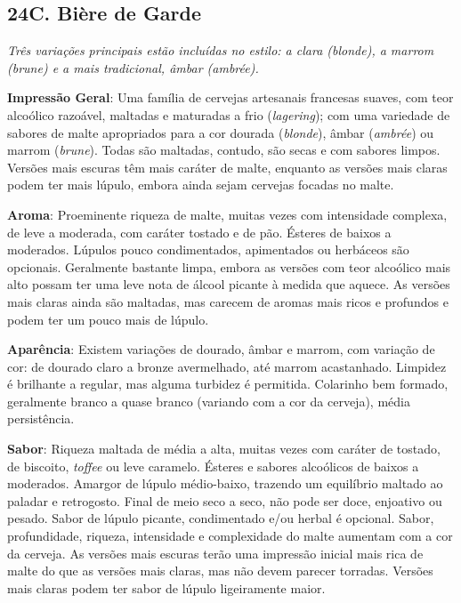 \subsection*{24C. Bière de Garde}
\textit{Três variações principais estão incluídas no estilo: a clara (blonde), a marrom (brune) e a mais tradicional, âmbar (ambrée).}

\textbf{Impressão Geral}: Uma família de cervejas artesanais francesas suaves, com teor alcoólico razoável, maltadas e maturadas a frio (\textit{lagering}); com uma variedade de sabores de malte apropriados para a cor dourada (\textit{blonde}), âmbar (\textit{ambrée}) ou marrom (\textit{brune}). Todas são maltadas, contudo, são secas e com sabores limpos. Versões mais escuras têm mais caráter de malte, enquanto as versões mais claras podem ter mais lúpulo, embora ainda sejam cervejas focadas no malte.

\textbf{Aroma}: Proeminente riqueza de malte, muitas vezes com intensidade complexa, de leve a moderada, com caráter tostado e de pão. Ésteres de baixos a moderados. Lúpulos pouco condimentados, apimentados ou herbáceos são opcionais. Geralmente bastante limpa, embora as versões com teor alcoólico mais alto possam ter uma leve nota de álcool picante à medida que aquece. As versões mais claras ainda são maltadas, mas carecem de aromas mais ricos e profundos e podem ter um pouco mais de lúpulo.

\textbf{Aparência}: Existem variações de dourado, âmbar e marrom, com variação de cor: de dourado claro a bronze avermelhado, até marrom acastanhado. Limpidez é brilhante a regular, mas alguma turbidez é permitida. Colarinho bem formado, geralmente branco a quase branco (variando com a cor da cerveja), média persistência.

\textbf{Sabor}: Riqueza maltada de média a alta, muitas vezes com caráter de tostado, de biscoito, \textit{toffee} ou leve caramelo. Ésteres e sabores alcoólicos de baixos a moderados. Amargor de lúpulo médio-baixo, trazendo um equilíbrio maltado ao paladar e retrogosto. Final de meio seco a seco, não pode ser doce, enjoativo ou pesado. Sabor de lúpulo picante, condimentado e/ou herbal é opcional. Sabor, profundidade, riqueza, intensidade e complexidade do malte aumentam com a cor da cerveja. As versões mais escuras terão uma impressão inicial mais rica de malte do que as versões mais claras, mas não devem parecer torradas. Versões mais claras podem ter sabor de lúpulo ligeiramente maior.

